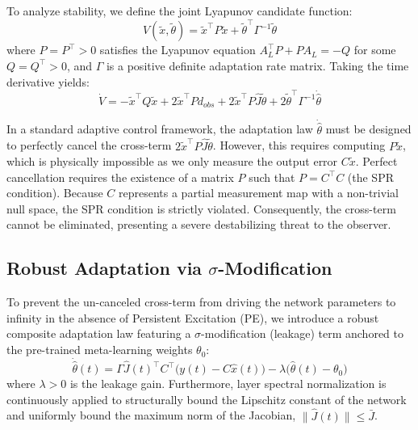 \documentclass[letterpaper, 10 pt, conference]{ieeeconf}  %
\begin{document}
To analyze stability, we define the joint Lyapunov candidate function:
\begin{equation}
    V(\tilde{x}, \tilde{\theta}) = \tilde{x}^\top P \tilde{x} + \tilde{\theta}^\top \Gamma^{-1} \tilde{\theta}
\end{equation}
where $P = P^\top > 0$ satisfies the Lyapunov equation $A_L^\top P + P A_L = -Q$ for some $Q = Q^\top > 0$, and $\Gamma$ is a positive definite adaptation rate matrix. Taking the time derivative yields:
\begin{equation}
    \dot{V} = -\tilde{x}^\top Q \tilde{x} + 2\tilde{x}^\top P d_{obs} + 2\tilde{x}^\top P \hat{J} \tilde{\theta} + 2\tilde{\theta}^\top \Gamma^{-1} \dot{\hat{\theta}}
\end{equation}

In a standard adaptive control framework, the adaptation law $\dot{\hat{\theta}}$ must be designed to perfectly cancel the cross-term $2\tilde{x}^\top P \hat{J} \tilde{\theta}$. However, this requires computing $P\tilde{x}$, which is physically impossible as we only measure the output error $C\tilde{x}$. Perfect cancellation requires the existence of a matrix $P$ such that $P = C^\top C$ (the SPR condition). Because $C$ represents a partial measurement map with a non-trivial null space, the SPR condition is strictly violated. Consequently, the cross-term cannot be eliminated, presenting a severe destabilizing threat to the observer.

\subsection{Robust Adaptation via $\sigma$-Modification}

To prevent the un-canceled cross-term from driving the network parameters to infinity in the absence of Persistent Excitation (PE), we introduce a robust composite adaptation law featuring a $\sigma$-modification (leakage) term anchored to the pre-trained meta-learning weights $\theta_0$:
\begin{equation}
    \dot{\hat{\theta}}(t) = \Gamma \hat{J}(t)^\top C^\top \big( y(t) - C\hat{x}(t) \big) - \lambda \big( \hat{\theta}(t) - \theta_0 \big)
\end{equation}
where $\lambda > 0$ is the leakage gain. Furthermore, layer spectral normalization is continuously applied to structurally bound the Lipschitz constant of the network and uniformly bound the maximum norm of the Jacobian, $\|\hat{J}(t)\| \le \bar{J}$.
\end{document}
